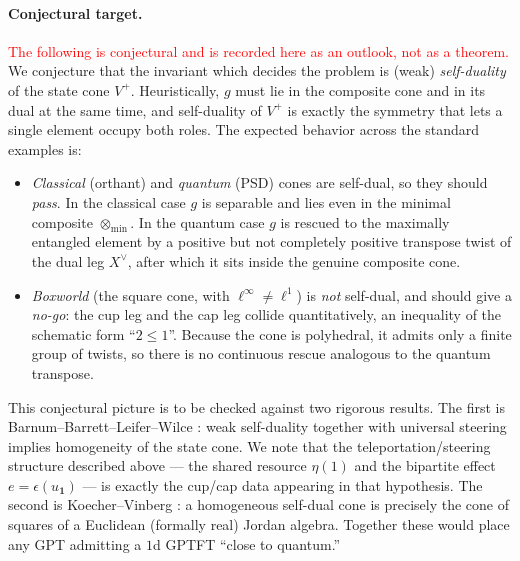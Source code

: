 \documentclass[prl,aps,10pt,superscriptaddress, floatfix]{revtex4-2}
\newcommand{\tmp}[1]{\textcolor{red}{#1}}
\begin{document}
\paragraph*{Conjectural target.}
\tmp{The following is conjectural and is recorded here as an outlook, not as a theorem.} We conjecture that the invariant which decides the problem is (weak) \emph{self-duality} of the state cone $V^+$. Heuristically, $g$ must lie in the composite cone and in its dual at the same time, and self-duality of $V^+$ is exactly the symmetry that lets a single element occupy both roles. The expected behavior across the standard examples is:
\begin{itemize}
\item \emph{Classical} (orthant) and \emph{quantum} (PSD) cones are self-dual, so they should \emph{pass}. In the classical case $g$ is separable and lies even in the minimal composite $\otimes_{\min}$. In the quantum case $g$ is rescued to the maximally entangled element by a positive but not completely positive transpose twist of the dual leg $X^\vee$, after which it sits inside the genuine composite cone.
\item \emph{Boxworld} (the square cone, with $\ell^\infty\neq\ell^1$) is \emph{not} self-dual, and should give a \emph{no-go}: the cup leg and the cap leg collide quantitatively, an inequality of the schematic form ``$2\le1$''. Because the cone is polyhedral, it admits only a finite group of twists, so there is no continuous rescue analogous to the quantum transpose.
\end{itemize}
This conjectural picture is to be checked against two rigorous results. The first is Barnum--Barrett--Leifer--Wilce \cite{BarnumBarrettLeiferWilce}: weak self-duality together with universal steering implies homogeneity of the state cone. We note that the teleportation/steering structure described above --- the shared resource $\eta(1)$ and the bipartite effect $e=\epsilon(u_{\mathbf 1})$ --- is exactly the cup/cap data appearing in that hypothesis. The second is Koecher--Vinberg \cite{KoecherVinberg}: a homogeneous self-dual cone is precisely the cone of squares of a Euclidean (formally real) Jordan algebra. Together these would place any GPT admitting a $1$d GPTFT ``close to quantum.''
\end{document}
